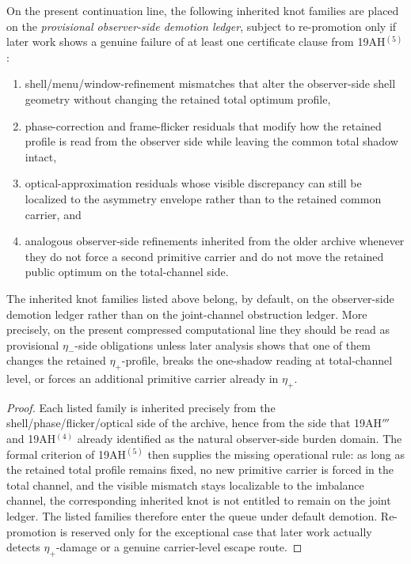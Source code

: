 \begin{definition}
On the present continuation line, the following inherited knot families are placed on the \emph{provisional observer-side demotion ledger}, subject to re-promotion only if later work shows a genuine failure of at least one certificate clause from 19AH$^{(5)}$:
\begin{enumerate}[leftmargin=2em]
 \item shell/menu/window-refinement mismatches that alter the observer-side shell geometry without changing the retained total optimum profile,
 \item phase-correction and frame-flicker residuals that modify how the retained profile is read from the observer side while leaving the common total shadow intact,
 \item optical-approximation residuals whose visible discrepancy can still be localized to the asymmetry envelope rather than to the retained common carrier, and
 \item analogous observer-side refinements inherited from the older archive whenever they do not force a second primitive carrier and do not move the retained public optimum on the total-channel side.
\end{enumerate}
\end{definition}

\begin{proposition}
The inherited knot families listed above belong, by default, on the observer-side demotion ledger rather than on the joint-channel obstruction ledger. More precisely, on the present compressed computational line they should be read as provisional \(\eta_-\)-side obligations unless later analysis shows that one of them changes the retained \(\eta_+\)-profile, breaks the one-shadow reading at total-channel level, or forces an additional primitive carrier already in \(\eta_+\).
\end{proposition}

\begin{proof}
Each listed family is inherited precisely from the shell/phase/flicker/optical side of the archive, hence from the side that 19AH$'''$ and 19AH$^{(4)}$ already identified as the natural observer-side burden domain. The formal criterion of 19AH$^{(5)}$ then supplies the missing operational rule: as long as the retained total profile remains fixed, no new primitive carrier is forced in the total channel, and the visible mismatch stays localizable to the imbalance channel, the corresponding inherited knot is not entitled to remain on the joint ledger. The listed families therefore enter the queue under default demotion. Re-promotion is reserved only for the exceptional case that later work actually detects \(\eta_+\)-damage or a genuine carrier-level escape route.
\end{proof}

